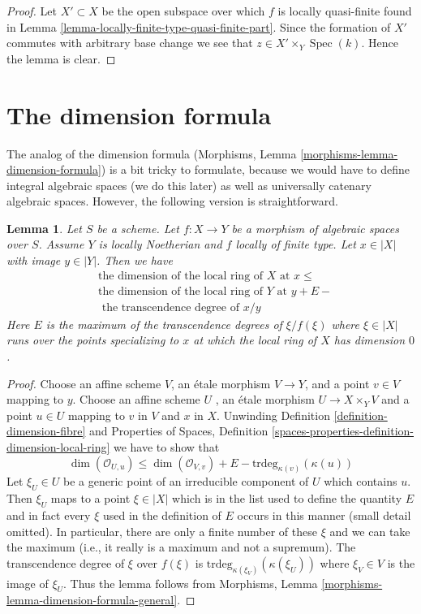 \documentclass{stacks-project}
\theoremstyle{plain}
\newtheorem{lemma}[subsection]{Lemma}
\theoremstyle{definition}
\theoremstyle{remark}
\numberwithin{equation}{subsection}
\def\Spec{\mathop{\mathrm{Spec}}}
\begin{document}
\begin{proof}
Let $X' \subset X$ be the open subspace over which $f$ is locally quasi-finite
found in
Lemma \ref{lemma-locally-finite-type-quasi-finite-part}.
Since the formation of $X'$ commutes with arbitrary base change we see
that $z \in X' \times_Y \Spec(k)$. Hence the lemma is clear.
\end{proof}





\section{The dimension formula}
\label{section-dimension-formula}

\noindent
The analog of the dimension formula
(Morphisms, Lemma \ref{morphisms-lemma-dimension-formula})
is a bit tricky to formulate, because we would have to define
integral algebraic spaces (we do this later) as well as
universally catenary algebraic spaces. However, the
following version is straightforward.

\begin{lemma}
\label{lemma-dimension-formula-general}
Let $S$ be a scheme. Let $f : X \to Y$ be a morphism of algebraic
spaces over $S$. Assume $Y$ is locally Noetherian and $f$ locally
of finite type. Let $x \in |X|$ with image $y \in |Y|$.
Then we have
\begin{align*}
& \text{the dimension of the local ring of }X\text{ at }x \leq \\
& \text{the dimension of the local ring of }Y\text{ at }y + E - \\
& \text{ the transcendence degree of }x/y
\end{align*}
Here $E$ is the maximum of the transcendence degrees of $\xi/f(\xi)$
where $\xi \in |X|$ runs over the points specializing to $x$ at
which the local ring of $X$ has dimension $0$.
\end{lemma}

\begin{proof}
Choose an affine scheme $V$, an \'etale morphism $V \to Y$, and a point
$v \in V$ mapping to $y$. Choose an affine scheme $U$ , an \'etale morphism
$U \to X \times_Y V$ and a point $u \in U$ mapping to $v$ in $V$ and $x$
in $X$. Unwinding Definition \ref{definition-dimension-fibre} and
Properties of Spaces, Definition
\ref{spaces-properties-definition-dimension-local-ring}
we have to show that
$$
\dim(\mathcal{O}_{U, u}) \leq
\dim(\mathcal{O}_{V, v}) + E - \text{trdeg}_{\kappa(v)}(\kappa(u))
$$
Let $\xi_U \in U$ be a generic point of an irreducible component of
$U$ which contains $u$. Then $\xi_U$ maps to a point $\xi \in |X|$
which is in the list used to define the quantity $E$ and in fact
every $\xi$ used in the definition of $E$ occurs in this manner
(small detail omitted). In particular, there are only a finite
number of these $\xi$ and we can take the maximum (i.e., it really
is a maximum and not a supremum).
The transcendence degree of $\xi$ over $f(\xi)$ is
$\text{trdeg}_{\kappa(\xi_V)}(\kappa(\xi_U))$ where $\xi_V \in V$
is the image of $\xi_U$. Thus the lemma follows from
Morphisms, Lemma \ref{morphisms-lemma-dimension-formula-general}.
\end{proof}
\end{document}
